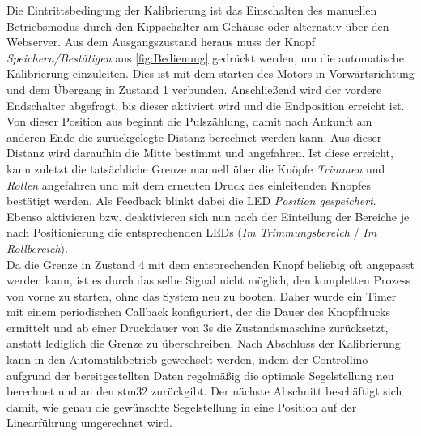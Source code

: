 \noindent
Die Eintrittsbedingung der Kalibrierung ist das Einschalten des manuellen Betriebsmodus durch den Kippschalter am Gehäuse oder alternativ über den Webserver. Aus dem Ausgangszustand heraus muss der Knopf \textit{Speichern/Bestätigen} aus \autoref{fig:Bedienung} gedrückt werden, um die automatische Kalibrierung einzuleiten. Dies ist mit dem starten des Motors in Vorwärtsrichtung und dem Übergang in Zustand 1 verbunden. Anschließend wird der vordere Endschalter abgefragt, bis dieser aktiviert wird und die Endposition erreicht ist. Von dieser Position aus beginnt die Pulszählung, damit nach Ankunft am anderen Ende die zurückgelegte Distanz berechnet werden kann. Aus dieser Distanz wird daraufhin die Mitte bestimmt und angefahren. Ist diese erreicht, kann zuletzt die tatsächliche Grenze manuell über die Knöpfe \textit{Trimmen} und \textit{Rollen} angefahren und mit dem erneuten Druck des einleitenden Knopfes bestätigt werden. Als Feedback blinkt dabei die LED \textit{Position gespeichert}. Ebenso aktivieren bzw. deaktivieren sich nun nach der Einteilung der Bereiche je nach Positionierung die entsprechenden LEDs (\textit{Im Trimmungsbereich} / \textit{Im Rollbereich}).\\

\noindent
Da die Grenze in Zustand 4 mit dem entsprechenden Knopf beliebig oft angepasst werden kann, ist es durch das selbe Signal nicht möglich, den kompletten Prozess von vorne zu starten, ohne das System neu zu booten. Daher wurde ein Timer mit einem periodischen Callback konfiguriert, der die Dauer des Knopfdrucks ermittelt und ab einer Druckdauer von 3s die Zustandsmaschine zurücksetzt, anstatt lediglich die Grenze zu überschreiben. Nach Abschluss der Kalibrierung kann in den Automatikbetrieb gewechselt werden, indem der Controllino aufgrund der bereitgestellten Daten regelmäßig die optimale Segelstellung neu berechnet und an den stm32 zurückgibt. Der nächste Abschnitt beschäftigt sich damit, wie genau die gewünschte Segelstellung in eine Position auf der Linearführung umgerechnet wird. 
